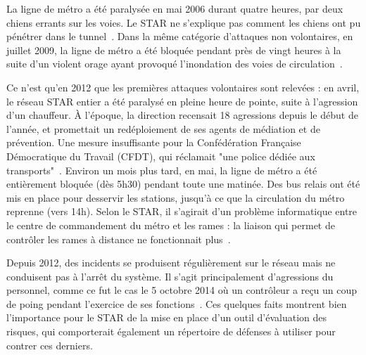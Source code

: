         La ligne de métro a été paralysée en mai 2006 durant quatre heures, par deux chiens errants sur les voies. Le STAR ne s'explique pas comment les chiens ont pu pénétrer dans le tunnel~\cite{chiens_metro}. Dans la même catégorie d'attaques non volontaires, en juillet 2009, la ligne de métro a été bloquée pendant près de vingt heures à la suite d'un violent orage ayant provoqué l'inondation des voies de circulation~\cite{metro_orage}.
        
        Ce n'est qu'en 2012 que les premières attaques volontaires sont relevées : en avril, le réseau STAR entier a été paralysé en pleine heure de pointe, suite à l'agression d'un chauffeur. À l'époque, la direction recensait 18 agressions depuis le début de l'année, et promettait un redéploiement de ses agents de médiation et de prévention. Une mesure insuffisante pour la Confédération Française Démocratique du Travail (CFDT), qui réclamait "une police dédiée aux transports"~\cite{bus_agression}. Environ un mois plus tard, en mai, la ligne de métro a été entièrement bloquée (dès 5h30) pendant toute une matinée. Des bus relais ont été mis en place pour desservir les stations, jusqu'à ce que la circulation du métro reprenne (vers 14h). Selon le STAR, il s’agirait d’un problème informatique entre le centre de commandement du métro et les rames : la liaison qui permet de contrôler les rames à distance ne fonctionnait plus~\cite{metro_info}. 
        
        Depuis 2012, des incidents se produisent régulièrement sur le réseau mais ne conduisent pas à l'arrêt du système. Il s'agit principalement d'agressions du personnel, comme ce fut le cas le 5 octobre 2014 où un contrôleur a reçu un coup de poing pendant l'exercice de ses fonctions~\cite{coup_poing_rennes}. Ces quelques faits montrent bien l'importance pour le STAR de la mise en place d'un outil d'évaluation des risques, qui comporterait également un répertoire de défenses à utiliser pour contrer ces derniers.
